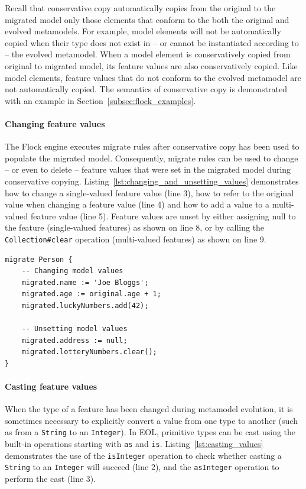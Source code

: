Recall that conservative copy automatically copies from the original to the migrated model only those elements that conform to the both the original and evolved metamodels. For example, model elements will not be automatically copied when their type does not exist in -- or cannot be instantiated according to -- the evolved metamodel. When a model element is conservatively copied from original to migrated model, its feature values are also conservatively copied. Like model elements, feature values that do not conform to the evolved metamodel are not automatically copied. The semantics of conservative copy is demonstrated with an example in Section~\ref{subsec:flock_examples}.

\paragraph{Changing feature values} The Flock engine executes migrate rules after conservative copy has been used to populate the migrated model. Consequently, migrate rules can be used to change -- or even to delete -- feature values that were set in the migrated model during conservative copying. Listing~\ref{lst:changing_and_unsetting_values} demonstrates how to change a single-valued feature value (line 3), how to refer to the original value when changing a feature value (line 4) and how to add a value to a multi-valued feature value (line 5). Feature values are unset by either assigning null to the feature (single-valued features) as shown on line 8, or by calling the \texttt{Collection\#clear} operation (multi-valued features) as shown on line 9.

\begin{lstlisting}[caption=Changing and unsetting conservatively copied feature values, label=lst:changing_and_unsetting_values, language=Flock, float=tb]
migrate Person {
	-- Changing model values
	migrated.name := 'Joe Bloggs';
	migrated.age := original.age + 1;
	migrated.luckyNumbers.add(42);
	
	-- Unsetting model values
	migrated.address := null;
	migrated.lotteryNumbers.clear();
}
\end{lstlisting}

\paragraph{Casting feature values} When the type of a feature has been changed during metamodel evolution, it is sometimes necessary to explicitly convert a value from one type to another (such as from a \texttt{String} to an \texttt{Integer}). In EOL, primitive types can be cast using the built-in operations starting with \texttt{as} and \texttt{is}. Listing~\ref{lst:casting_values} demonstrates the use of the \texttt{isInteger} operation to check whether casting a \texttt{String} to an \texttt{Integer} will succeed (line 2), and the \texttt{asInteger} operation to perform the cast (line 3).


